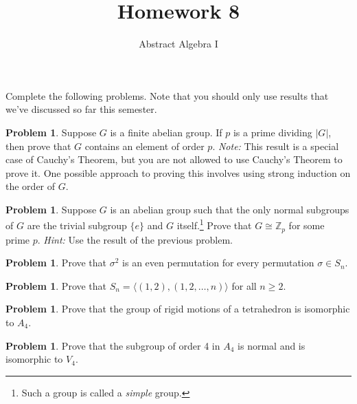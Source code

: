 \documentclass[11pt]{scrartcl}
\theoremstyle{definition}
\newtheorem{problem}[theorem]{Problem}
\begin{document}
\title{Homework 8}
\subtitle{Abstract Algebra I}
\date{}

\maketitle
\thispagestyle{fancy}

Complete the following problems. Note that you should only use results that we've discussed so far this semester.

\begin{problem}
Suppose $G$ is a finite abelian group. If $p$ is a prime dividing $|G|$, then prove that $G$ contains an element of order $p$.  \emph{Note:} This result is a special case of Cauchy's Theorem, but you are not allowed to use Cauchy's Theorem to prove it.  One possible approach to proving this involves using strong induction on the order of $G$.
\end{problem}

\begin{problem}
Suppose $G$ is an abelian group such that the only normal subgroups of $G$ are the trivial subgroup $\{e\}$ and $G$ itself.\footnote{Such a group is called a \emph{simple} group.} Prove that $G\cong \mathbb{Z}_p$ for some prime $p$.  \emph{Hint:} Use the result of the previous problem.
\end{problem}

\begin{problem}
Prove that $\sigma^2$ is an even permutation for every permutation $\sigma\in S_n$.
\end{problem}

\begin{problem}
Prove that $S_n=\langle (1,2),(1,2,\ldots,n)\rangle$ for all $n\geq 2$.
\end{problem}


\begin{problem}
Prove that the group of rigid motions of a tetrahedron is isomorphic to $A_4$.
\end{problem}

\begin{problem}
Prove that the subgroup of order 4 in $A_4$ is normal and is isomorphic to $V_4$.
\end{problem}
\end{document}
